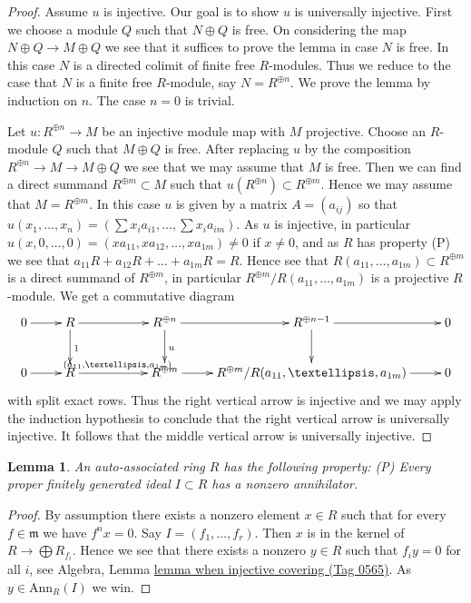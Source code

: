\documentclass{amsart}
\theoremstyle{plain}
\newtheorem{lemma}[subsection]{Lemma}
\theoremstyle{definition}
\theoremstyle{remark}
\numberwithin{equation}{subsection}
\begin{document}
\begin{proof}
Assume $u$ is injective. Our goal is to show $u$ is universally injective.
First we choose a module $Q$ such that $N \oplus Q$ is free. On considering
the map $N \oplus Q \to M \oplus Q$ we see that it suffices to prove
the lemma in case $N$ is free. In this case $N$ is a directed colimit of
finite free $R$-modules. Thus we reduce to the case that $N$ is a finite
free $R$-module, say $N = R^{\oplus n}$. We prove the lemma by induction
on $n$. The case $n = 0$ is trivial.

\medskip\noindent
Let $u : R^{\oplus n} \to M$ be an injective module map with $M$ projective.
Choose an $R$-module $Q$ such that $M \oplus Q$ is free. After replacing
$u$ by the composition $R^{\oplus n} \to M \to M \oplus Q$ we see that
we may assume that $M$ is free. Then we can find a direct summand
$R^{\oplus m} \subset M$ such that $u(R^{\oplus n}) \subset R^{\oplus m}$.
Hence we may assume that $M = R^{\oplus m}$.
In this case $u$ is given by a matrix $A = (a_{ij})$ so that
$u(x_1, \ldots, x_n) = (\sum x_i a_{i1}, \ldots, \sum x_i a_{im})$.
As $u$ is injective, in particular
$u(x, 0, \ldots, 0) = (xa_{11}, xa_{12}, \ldots, xa_{1m}) \not = 0$ if
$x \not = 0$, and as $R$ has property (P) we see that
$a_{11}R + a_{12}R + \ldots + a_{1m}R = R$. Hence see that
$R(a_{11}, \ldots, a_{1m}) \subset R^{\oplus m}$ is a direct summand
of $R^{\oplus m}$, in particular $R^{\oplus m}/R(a_{11}, \ldots, a_{1m})$
is a projective $R$-module. We get a commutative diagram
$$
\xymatrix{
0 \ar[r] &
R \ar[rr] \ar[d]^1 & & R^{\oplus n} \ar[r] \ar[d]^u &
R^{\oplus n - 1} \ar[r] \ar[d] & 0 \\
0 \ar[r] & R \ar[rr]^{(a_{11}, \ldots, a_{1m})} & &
R^{\oplus m} \ar[r] & R^{\oplus m}/R(a_{11}, \ldots, a_{1m}) \ar[r] & 0
}
$$
with split exact rows. Thus the right vertical arrow is injective
and we may apply the induction hypothesis to conclude that
the right vertical arrow is universally injective. It follows that the
middle vertical arrow is universally injective.
\end{proof}


\begin{lemma}
\label{more-algebra-lemma-auto-ass-implies-P}
An auto-associated ring $R$ has the following property: (P)
Every proper finitely generated ideal $I \subset R$ has a nonzero
annihilator.
\end{lemma}

\begin{proof}
By assumption there exists a nonzero element $x \in R$ such that for every
$f \in \mathfrak m$ we have $f^n x = 0$. Say $I = (f_1, \ldots, f_r)$.
Then $x$ is in the kernel of $R \to \bigoplus R_{f_i}$. Hence we see
that there exists a nonzero $y \in R$ such that $f_i y = 0$ for all $i$, see
Algebra, Lemma \href{https://stacks.math.columbia.edu/tag/0565}{lemma when injective covering (Tag 0565)}.
As $y \in \text{Ann}_R(I)$ we win.
\end{proof}
\end{document}
